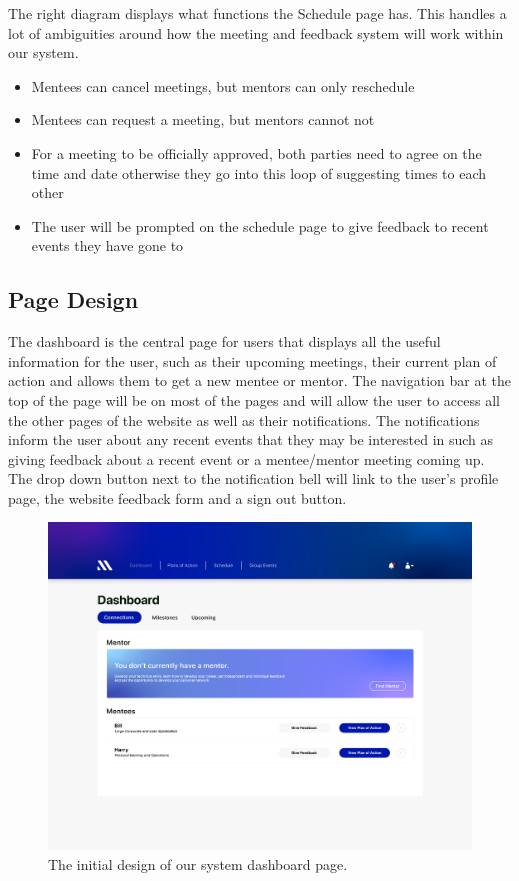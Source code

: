 \documentclass[10pt]{article}
\begin{document}
The right diagram displays what functions the Schedule page has. This handles a
lot of ambiguities around how the meeting and feedback system will work within
our system.
\begin{itemize}[leftmargin=1.2cm,noitemsep,align=left]
    \item Mentees can cancel meetings, but mentors can only reschedule
    \item Mentees can request a meeting, but mentors cannot not
    \item For a meeting to be officially approved, both parties need to agree on
    the time and date otherwise they go into this loop of suggesting times to
    each other
    \item The user will be prompted on the schedule page to give feedback to recent events they have gone to
\end{itemize}

\pagebreak

\subsection{Page Design}

The dashboard is the central page for users that displays all the useful
information for the user, such as their upcoming meetings, their current plan of
action and allows them to get a new mentee or mentor. The navigation bar at the
top of the page will be on most of the pages and will allow the user to access
all the other pages of the website as well as their notifications. The
notifications inform the user about any recent events that they may be
interested in such as giving feedback about a recent event or a mentee/mentor
meeting coming up. The drop down button next to the notification bell will link
to the user's profile page, the website feedback form and a sign out button.

\begin{figure}[H]
    \centering
    \includegraphics[width=0.48 \textwidth]{Dashboard}
    \caption{The initial design of our system dashboard page.}
    \label{fig:dashboard}
\end{figure}
\end{document}
